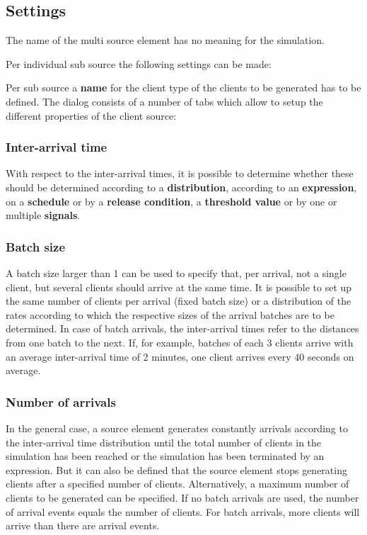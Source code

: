 \subsection*{Settings}

The name of the multi source element has no meaning for the simulation.

Per individual sub source the following settings can be made:

Per sub source a \textbf{name} for the client type of the clients to be generated has to be defined.
The dialog consists of a number of tabs which allow to setup the different properties of the client source:

\subsubsection*{Inter-arrival time}

With respect to the inter-arrival times, it is possible to determine whether these
should be determined according to a \textbf{distribution}, according to an \textbf{expression},
on a \textbf{schedule} or by a \textbf{release condition}, a \textbf{threshold value} or by
one or multiple \textbf{signals}.

\subsubsection*{Batch size}

A batch size larger than 1 can be used to specify that, per arrival, not a single client,
but several clients should arrive at the same time. It is possible to set up the same number
of clients per arrival (fixed batch size) or a distribution of the rates according to which
the respective sizes of the arrival batches are to be determined.
In case of batch arrivals, the inter-arrival times refer to the distances from one batch to the next.
If, for example, batches of each 3 clients arrive with an average inter-arrival time of 2 minutes,
one client arrives every 40 seconds on average.

\subsubsection*{Number of arrivals}

In the general case, a source element generates constantly arrivals according to the
inter-arrival time distribution until the total number of clients in the simulation has been reached
or the simulation has been terminated by an expression. But it can also be defined that the
source element stops generating clients after a specified number of clients.
Alternatively, a maximum number of clients to be generated can be specified.
If no batch arrivals are used, the number of arrival events equals the
number of clients. For batch arrivals, more clients will arrive than there are arrival events.

